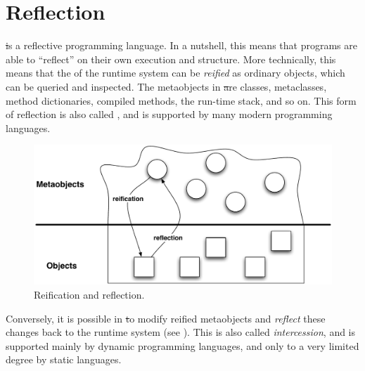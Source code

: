 \documentclass[a4paper,10pt,twoside]{book}
\begin{document}
	\sloppy
\fi


\chapter{Reflection}



\st is a reflective programming language.
In a nutshell, this means that programs are able to ``reflect'' on their own execution and structure.
More technically, this means that the  of the runtime system can be \emph{reified} as ordinary objects, which can be queried and inspected.
The metaobjects in \st are classes, metaclasses, method dictionaries, compiled methods, the run-time stack, and so on.
This form of reflection is also called , and is supported by many modern programming languages.

\begin{figure}[ht]\centering
	\includegraphics[width=0.8\linewidth]{reflect}
	\caption{Reification and reflection.}
\end{figure}

Conversely, it is possible in \st to modify reified metaobjects and \emph{reflect} these changes back to the runtime system (see ).
This is also called \emph{intercession}, and is supported mainly by dynamic programming languages, and only to a very limited degree by static languages.
\end{document}
